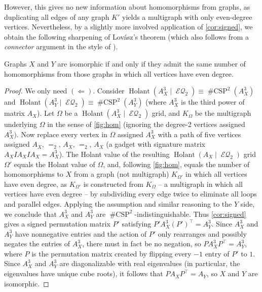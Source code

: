 \documentclass{article}
\DeclareMathOperator{\holant}{Holant}
\DeclareMathOperator{\csp}{\#CSP}
\DeclareMathOperator{\eq}{\mathcal{EQ}}
\begin{document}
However, this gives no new information about homomorphisms from graphs, as
duplicating all edges of any graph $K'$ yields a multigraph with 
only even-degree vertices. Nevertheless, by a slightly more involved application of 
\autoref{cor:signed}, we obtain the following sharpening of Lovász's theorem (which also
follows from a \emph{connector} argument in the style of \cite{dvorak_recognizing_2010}).
\begin{corollary}
    Graphs $X$ and $Y$ are isomorphic if and only if they admit the same number of homomorphisms
    from those graphs in which all vertices have even degree.
\end{corollary}
\begin{proof}
    We only need $(\Longleftarrow)$. Consider
    $\holant(A_X^3 \mid \eq_2) \equiv \csp^2(A_X^3)$ and
    $\holant(A_Y^3 \mid \eq_2) \equiv \csp^2(A_Y^3)$ (where $A_X^3$ is the third power of
    matrix $A_X$). Let $\Omega$ be a
    $\holant(A_X^3 \mid \eq_2)$ grid, and $K_\Omega$ be the multigraph underlying $\Omega$ in
    the sense of \autoref{fig:hom} (ignoring the degree-2 vertices assigned $A_X^3)$.
    Now replace every vertex in $\Omega$ assigned $A_X^3$ with a path of five vertices 
    assigned $A_X$, $=_2$, $A_X$, $=_2$, $A_X$
    (a gadget with signature matrix $A_X I A_X I A_X = A_X^3$).
    The Holant value of the resulting 
    $\holant(A_X \mid \eq_2)$ grid $\Omega'$ equals the
    Holant value of $\Omega$, and, following \autoref{fig:hom}, equals the number of 
    homomorphisms to $X$ from a graph (not multigraph) $K_{\Omega'}$ in which all vertices 
    have even 
    degree, as $K_{\Omega'}$ is constructed from $K_\Omega$ -- a multigraph in which all 
    vertices have even degree -- by subdividing every edge twice to eliminate all loops
    and parallel edges. Applying the assumption and similar reasoning to
    the $Y$ side, we conclude that $A_X^3$ and $A_Y^3$ are
    $\csp^2$-indistinguishable. Thus \autoref{cor:signed} gives a signed
    permutation matrix $P'$ satisfying $P' A_X^3 (P')^\top = A_Y^3$.
    Since $A_X^3$ and $A_Y^3$ have nonnegative entries and the action of $P'$ only rearranges
    and possibly negates the entries of $A_X^3$, there must in fact be no negation, so
    $P A_X^3 P^\top = A_Y^3$,
    where $P$ is the permutation matrix created by flipping every $-1$ entry of $P'$ to $1$. 
    Since $A_X^3$ and $A_Y^3$ are diagonalizable with real eigenvalues (in particular, the
    eigenvalues have unique cube roots), it follows that 
    $P A_X P^\top = A_Y$, so $X$ and $Y$ are isomorphic.
\end{proof}
\end{document}

